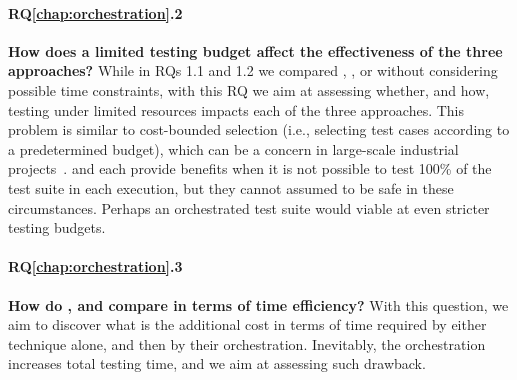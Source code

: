 \paragraph{RQ\ref{chap:orchestration}.2}\label{rq:orch2} \textbf{How does a limited testing budget affect the effectiveness of the three approaches?}
While in RQs 1.1 and 1.2 we compared \ek, \fs, or \fz without considering possible time constraints, with this RQ we aim at assessing whether, and how, testing under limited resources impacts each of the three approaches. 
This problem is similar to cost-bounded selection \cite{cibulski2011regression} (i.e., selecting
test cases according to a predetermined budget), which can be a concern in large-scale industrial projects~\cite{elbaum2014techniques}. 
\tcs and \tcp each provide benefits when it is not possible to test 100\% of the test suite in each execution, but they cannot assumed to be safe in these circumstances.
Perhaps an orchestrated test suite would viable at even stricter testing budgets.

\paragraph{RQ\ref{chap:orchestration}.3}\label{rq:orch3} \textbf{How do \ek, \fs and \fz compare in terms of time efficiency?}
With this question, we aim to discover what is the additional cost in terms of time required by either technique alone, and then by their orchestration.
Inevitably, the orchestration increases total testing time, and we aim at assessing such drawback.
